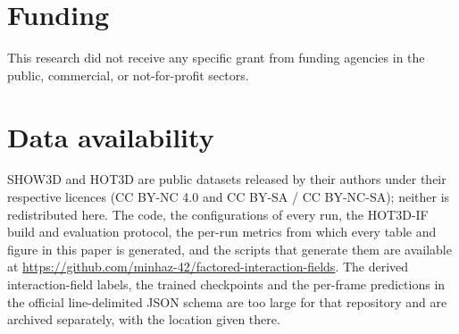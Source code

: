 \documentclass[final,5p,times,twocolumn]{elsarticle}
\begin{document}
\section*{Funding}
This research did not receive any specific grant from funding agencies in the public, commercial, or not-for-profit sectors.

\section*{Data availability}
SHOW3D and HOT3D are public datasets released by their authors under their respective licences (CC BY-NC 4.0 and CC BY-SA / CC BY-NC-SA); neither is redistributed here. The code, the configurations of every run, the HOT3D-IF build and evaluation protocol, the per-run metrics from which every table and figure in this paper is generated, and the scripts that generate them are available at \url{https://github.com/minhaz-42/factored-interaction-fields}. The derived interaction-field labels, the trained checkpoints and the per-frame predictions in the official line-delimited JSON schema are too large for that repository and are archived separately, with the location given there.



\end{document}
